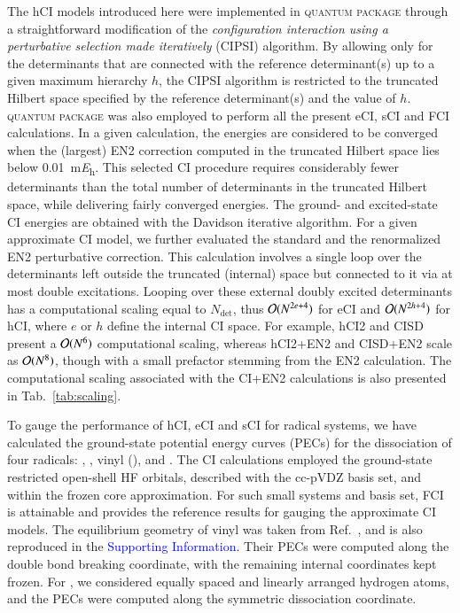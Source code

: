 \documentclass[aip,jcp,reprint,noshowkeys,superscriptaddress]{revtex4-1}
\newcommand{\SupInf}{\textcolor{blue}{Supporting Information}}
\newcommand{\QP}{\textsc{quantum package}}
\newcommand{\Ndet}{N_\text{det}}
\begin{document}
The hCI models introduced here were implemented in {\QP} \cite{Garniron_2019} through a straightforward modification of the
\textit{configuration interaction using a perturbative selection made iteratively} (CIPSI) algorithm. \cite{Huron_1973,Giner_2013,Giner_2015,Garniron_2018}
By allowing only for the determinants that are connected with the reference determinant(s) up to a given maximum hierarchy $h$,
the CIPSI algorithm is restricted to the truncated Hilbert space specified by the reference determinant(s) and the value of $h$.
{\QP} \cite{Garniron_2019} was also employed to perform all the present eCI, sCI and FCI calculations.
In a given calculation, the energies are considered to be converged when the (largest) EN2 correction computed in the truncated Hilbert space 
lies below \SI{0.01}{\milli\hartree}. \cite{Garniron_2018}
This selected CI procedure requires considerably fewer determinants than the total number of determinants in the truncated Hilbert space,
while delivering fairly converged energies.
The ground- and excited-state CI energies are obtained with the Davidson iterative algorithm. \cite{Davidson_1975}
For a given approximate CI model, we further evaluated the standard and the renormalized EN2 perturbative correction. \cite{Garniron_2019} 
This calculation involves a single loop over the determinants left outside the truncated (internal) space but connected to it via at most double excitations.
Looping over these external doubly excited determinants has a computational scaling equal to $\Ndet$,
thus $\order*{N^{2e+4}}$ for eCI and $\order*{N^{2h+4}}$ for hCI, where $e$ or $h$ define the internal CI space.
For example, hCI2 and CISD present a $\order*{N^6}$ computational scaling, whereas hCI2+EN2 and CISD+EN2 scale as $\order*{N^8}$,
though with a small prefactor stemming from the EN2 calculation.
The computational scaling associated with the CI+EN2 calculations is also presented in Tab.~\ref{tab:scaling}.

To gauge the performance of hCI, eCI and sCI for radical systems,
we have calculated the ground-state potential energy curves (PECs) for the dissociation of four radicals:
, , vinyl (), and .
The CI calculations employed the ground-state restricted open-shell HF orbitals, described with the cc-pVDZ basis set, and within the frozen core approximation.
For such small systems and basis set, FCI is attainable and provides the reference results for gauging the approximate CI models.
The equilibrium geometry of vinyl was taken from Ref.~, and is also reproduced in the {\SupInf}.
Their PECs were computed along the  double bond breaking coordinate, with the remaining internal coordinates kept frozen.
For , we considered equally spaced and linearly arranged hydrogen atoms, and the PECs were computed along the symmetric dissociation coordinate.
\end{document}

